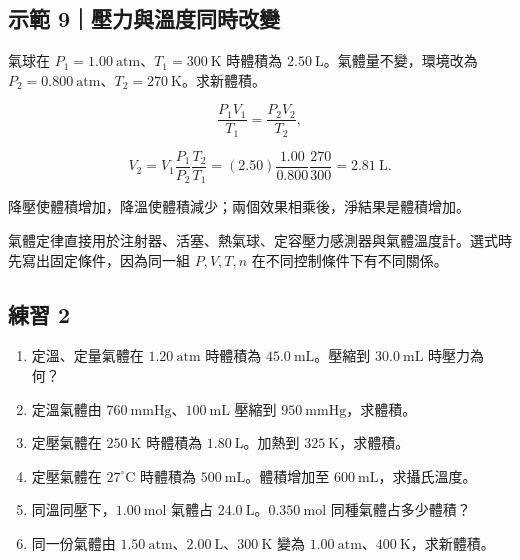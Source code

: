 \documentclass[11pt,a4paper]{article}
\providecommand{\tightlist}{%
  \setlength{\itemsep}{0pt}\setlength{\parskip}{0pt}}
\begin{document}
\begin{HandoutWorkedExample}

\subsection{示範 9｜壓力與溫度同時改變}\label{ux793aux7bc4-9ux58d3ux529bux8207ux6eabux5ea6ux540cux6642ux6539ux8b8a}

氣球在 \(P_1=1.00\ \mathrm{atm}\)、\(T_1=300\ \mathrm K\) 時體積為 \(2.50\ \mathrm L\)。氣體量不變，環境改為 \(P_2=0.800\ \mathrm{atm}\)、\(T_2=270\ \mathrm K\)。求新體積。

\[
\frac{P_1V_1}{T_1}=\frac{P_2V_2}{T_2},
\]

\[
V_2=V_1\frac{P_1}{P_2}\frac{T_2}{T_1}
=(2.50)\frac{1.00}{0.800}\frac{270}{300}=2.81\ \mathrm L.
\]

降壓使體積增加，降溫使體積減少；兩個效果相乘後，淨結果是體積增加。

\end{HandoutWorkedExample}

氣體定律直接用於注射器、活塞、熱氣球、定容壓力感測器與氣體溫度計。選式時先寫出固定條件，因為同一組 \(P,V,T,n\) 在不同控制條件下有不同關係。

\subsection{練習 2}\label{ux7df4ux7fd2-2}

\begin{enumerate}
\def\labelenumi{\arabic{enumi}.}
\tightlist
\item
  定溫、定量氣體在 \(1.20\ \mathrm{atm}\) 時體積為 \(45.0\ \mathrm{mL}\)。壓縮到 \(30.0\ \mathrm{mL}\) 時壓力為何？
\item
  定溫氣體由 \(760\ \mathrm{mmHg}\)、\(100\ \mathrm{mL}\) 壓縮到 \(950\ \mathrm{mmHg}\)，求體積。
\item
  定壓氣體在 \(250\ \mathrm K\) 時體積為 \(1.80\ \mathrm L\)。加熱到 \(325\ \mathrm K\)，求體積。
\item
  定壓氣體在 \(27^\circ\mathrm C\) 時體積為 \(500\ \mathrm{mL}\)。體積增加至 \(600\ \mathrm{mL}\)，求攝氏溫度。
\item
  同溫同壓下，\(1.00\ \mathrm{mol}\) 氣體占 \(24.0\ \mathrm L\)。\(0.350\ \mathrm{mol}\) 同種氣體占多少體積？
\item
  同一份氣體由 \(1.50\ \mathrm{atm}\)、\(2.00\ \mathrm L\)、\(300\ \mathrm K\) 變為 \(1.00\ \mathrm{atm}\)、\(400\ \mathrm K\)，求新體積。
\end{enumerate}
\end{document}
